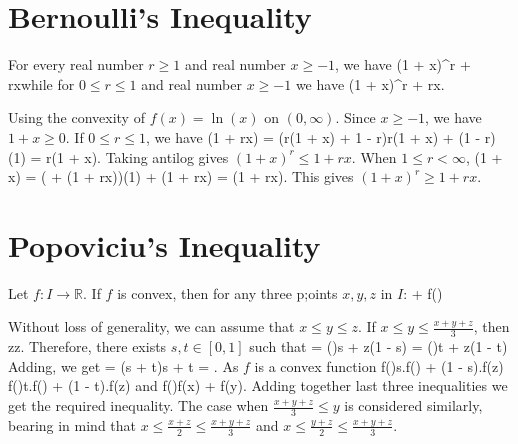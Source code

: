 \section{Bernoulli's Inequality}
\starttheorem
  For every real number $r\geq 1$ and real number $x\geq -1$, we have \startformula (1 + x)^r + rx\stopformula while for $0\leq r\leq 1$ and real
  number $x\geq -1$ we have \startformula (1 + x)^r + rx.\stopformula
\stoptheorem

\startproof
  Using the convexity of $f(x) = \ln(x)$ on $(0, \infty)$. Since $x\geq -1$, we have $1 + x\geq 0$. If $0 \leq r \leq 1$, we have
  \startformula \ln(1 + rx) = \ln(r(1 + x) + 1 - r)\geq r\ln(1 + x) + (1 - r)\ln(1) = r\ln(1 + x).\stopformula
  Taking antilog gives $(1 + x)^r\leq 1 + rx.$ When $1\leq r < \infty$,
  \startformula \ln(1 + x) = \ln\left( + (1 + rx)\right)\geq{}\ln(1) + \ln(1 + rx) =
  \ln(1 + rx).\stopformula
  This gives $(1 + x)^r\geq 1 + rx.$
\stopproof

\section{Popoviciu's Inequality}
\starttheorem
  Let $f: I\rightarrow\mathbb{R}$. If $f$ is convex, then for any three p;oints $x, y, z$ in $I$:
  \placeformula\startformula
     + f\left(\right)\geq {}
  \stopformula
\stoptheorem

\startproof
  Without loss of generality, we can assume that $x\leq y\leq z$. If $x\leq y\leq \frac{x + y + z}{3}$, then
  \startformula {}\leq {}\leq z\;\;\leq {}\leq z.\stopformula
  Therefore, there exists $s, t\in[0,1]$ such that
  \startformula {} = \left(\right)s + z(1 - s)\stopformula
  \startformula {} = \left(\right)t + z(1 - t)\stopformula
  Adding, we get
  \startformula {} = (s + t)\Rightarrow s + t = .\stopformula
  As $f$ is a convex function
  \startformula f\left(\right)\leq s.f\left(\right) + (1 - s).f(z)\stopformula
  \startformula f\left(\right)\leq t.f\left(\right) + (1 - t).f(z)\stopformula
  and
  \startformula f\left(\right)\leq {}f(x) + f(y).\stopformula
  Adding together last three inequalities we get the required inequality.
  The case when $\frac{x + y + z}{3}\leq y$ is considered similarly, bearing in mind that $x\leq \frac{x + z}{2}\leq \frac{x + y +
    z}{3}$ and $x\leq\frac{y + z}{2}\leq\frac{x + y + z}{3}$.

